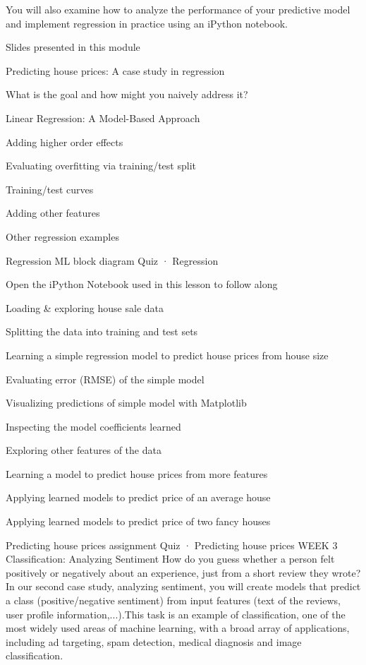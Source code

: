 You will also examine how to analyze the performance of your predictive model and implement regression in practice using an iPython notebook.
\item Slides presented in this module
\item Predicting house prices: A case study in regression
\item What is the goal and how might you naively address it?
\item Linear Regression: A Model-Based Approach
\item Adding higher order effects
\item Evaluating overfitting via training/test split
\item Training/test curves
\item Adding other features
\item Other regression examples
\item Regression ML block diagram
Quiz · Regression
\item Open the iPython Notebook used in this lesson to follow along
\item Loading & exploring house sale data
\item Splitting the data into training and test sets
\item Learning a simple regression model to predict house prices from house size
\item Evaluating error (RMSE) of the simple model
\item Visualizing predictions of simple model with Matplotlib
\item Inspecting the model coefficients learned
\item Exploring other features of the data
\item Learning a model to predict house prices from more features
\item Applying learned models to predict price of an average house
\item Applying learned models to predict price of two fancy houses
\item Predicting house prices assignment
Quiz · Predicting house prices
WEEK 3
Classification: Analyzing Sentiment
How do you guess whether a person felt positively or negatively about an experience, just from a short review they wrote?
In our second case study, analyzing sentiment, you will create models that predict a class (positive/negative sentiment) from input features (text of the reviews, user profile information,...).This task is an example of classification, one of the most widely used areas of machine learning, with a broad array of applications, including ad targeting, spam detection, medical diagnosis and image classification.

